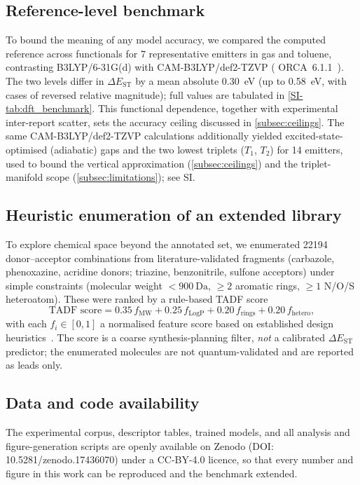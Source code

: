 \subsection{Reference-level benchmark}

To bound the meaning of any model accuracy, we compared the computed reference
across functionals for \num{7} representative emitters in gas and toluene,
contrasting B3LYP/6-31G(d) with CAM-B3LYP/def2-TZVP (%
ORCA~6.1.1~\cite{Neese2020}). The two levels differ in $\Delta E_\text{ST}$ by a
mean absolute \qty{0.30}{\electronvolt} (up to \qty{0.58}{\electronvolt}, with
cases of reversed relative magnitude); full values are tabulated in
\cref{SI-tab:dft_benchmark}. This functional dependence, together with
experimental inter-report scatter, sets the accuracy ceiling discussed in
\cref{subsec:ceilings}. The same CAM-B3LYP/def2-TZVP calculations additionally
yielded excited-state-optimised (adiabatic) gaps and the two lowest triplets
($T_1$, $T_2$) for \num{14} emitters, used to bound the vertical approximation
(\cref{subsec:ceilings}) and the triplet-manifold scope (\cref{subsec:limitations});
see SI.

\subsection{Heuristic enumeration of an extended library}\label{sec:library_expansion}

To explore chemical space beyond the annotated set, we enumerated \num{22194}
donor--acceptor combinations from literature-validated fragments (carbazole,
phenoxazine, acridine donors; triazine, benzonitrile, sulfone acceptors) under
simple constraints (molecular weight $<\qty{900}{\dalton}$, $\geq 2$ aromatic
rings, $\geq 1$ N/O/S heteroatom). These were ranked by a rule-based TADF score
\begin{equation}
  \text{TADF score} = 0.35\,f_\text{MW} + 0.25\,f_\text{LogP} + 0.20\,f_\text{rings} + 0.20\,f_\text{hetero},
  \label{eq:tadf_score}
\end{equation}
with each $f_i\in[0,1]$ a normalised feature score based on established design
heuristics~\cite{Liu2012,Uoyama2012,Wong2017}. The score is a coarse
synthesis-planning filter, \emph{not} a calibrated $\Delta E_\text{ST}$ predictor;
the enumerated molecules are not quantum-validated and are reported as leads only.

\subsection{Data and code availability}

The experimental corpus, descriptor tables, trained models, and all analysis and
figure-generation scripts are openly available on Zenodo
(DOI: 10.5281/zenodo.17436070) under a CC-BY-4.0 licence, so that every number and
figure in this work can be reproduced and the benchmark extended.
